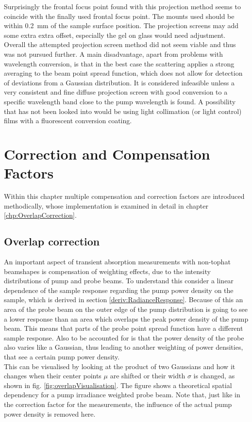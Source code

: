 \documentclass[twoside,openright,listof=numbered]{scrreprt}
\begin{document}
Surprisingly the frontal focus point found with this projection method seems to coincide with the finally used frontal focus point. The mounts used should be within \qty{0.2}{\milli\meter} of the sample surface position. The projection screens may add some extra extra offset, especially the gel on glass would need adjustment.
Overall the attempted projection screen method did not seem viable and thus was not pursued further. A main disadvantage, apart from problems with wavelength conversion, is that in the best case the scattering applies a strong averaging to the beam point spread function, which does not allow for detection of deviations from a Gaussian distribution. It is considered infeasible unless a very consistent and fine diffuse projection screen with good conversion to a specific wavelength band close to the pump wavelength is found. A possibility that has not been looked into would be using light collimation (or light control) films with a fluorescent conversion coating.



\chapter{Correction and Compensation Factors}\label{chap:CorrandComp}
Within this chapter multiple compensation and correction factors are introduced methodically, whose implementation is examined in detail in chapter \ref{chp:OverlapCorrection}.
\section{Overlap correction}\label{sec:overlapCorrDescription}
An important aspect of transient absorption measurements with non-tophat beamshapes is compensation of weighting effects, due to the intensity distributions of pump and probe beams. To understand this consider a linear dependence of the sample response regarding the pump power density on the sample, which is derived in section \ref{deriv:RadianceResponse}. Because of this an area of the probe beam on the outer edge of the pump distribution is going to see a lower response than an area which overlaps the peak power density of the pump beam. This means that parts of the probe point spread function have a different sample response. Also to be accounted for is that the power density of the probe also varies like a Gaussian, thus leading to another weighting of power densities, that see a certain pump power density.\\
This can be visualised by looking at the product of two Gaussians and how it changes when their center points $\mu$ are shifted or their width $\sigma$ is changed, as shown in fig. \ref{fig:overlapVisualisation}. The figure shows a theoretical spatial dependency for a pump irradiance weighted probe beam. Note that, just like in the correction factor for the measurements, the influence of the actual pump power density is removed here.
\end{document}
